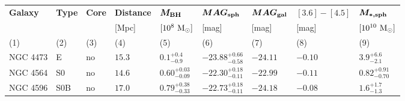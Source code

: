 \begin{table*}                                        
\small                                                
\begin{center}                                        
\begin{tabular}{lllllllll}                           
\hline                                                
\multicolumn{1}{l}{{\bf Galaxy}} &                   
\multicolumn{1}{l}{{\bf Type}} &                     
\multicolumn{1}{l}{{\bf Core}} &                     
\multicolumn{1}{l}{{\bf Distance}} &                 
\multicolumn{1}{l}{{\bf $\bm{M_{\rm BH}}$}} &  
\multicolumn{1}{l}{{\bf $\bm{MAG_{\rm sph}}$}} &  
\multicolumn{1}{l}{{\bf $\bm{MAG_{\rm gal}}$}} &  
\multicolumn{1}{l}{{\bf $\bm{[3.6]-[4.5]}$}} &  
\multicolumn{1}{l}{{\bf $\bm{M_{\rm *,sph}}$}} \\  
\multicolumn{1}{l}{} &                                
\multicolumn{1}{l}{} &                                
\multicolumn{1}{l}{} &                                
\multicolumn{1}{l}{[Mpc]} &                           
\multicolumn{1}{l}{$[10^8~\rm M_{\odot}]$} &         
\multicolumn{1}{l}{[mag]} &                                
\multicolumn{1}{l}{[mag]} &                                
\multicolumn{1}{l}{[mag]} &                                
\multicolumn{1}{l}{$[10^{10}~\rm M_{\odot}]$} \\                             
\multicolumn{1}{l}{(1)} &                             
\multicolumn{1}{l}{(2)} &                             
\multicolumn{1}{l}{(3)} &                             
\multicolumn{1}{l}{(4)} &                             
\multicolumn{1}{l}{(5)} &                             
\multicolumn{1}{l}{(6)} &                             
\multicolumn{1}{l}{(7)} &                             
\multicolumn{1}{l}{(8)} &                             
\multicolumn{1}{l}{(9)} \\                         
\hline                                                
NGC 4473  &  E  &  no   &  $15.3$  &  $0.1_{-0.9}^{+0.4}$   &  $-23.88_{-0.58}^{+0.66}$   &  $-24.11$   &  $-0.10$  &  $3.9_{-2.1}^{+6.6}$   \\ 
NGC 4564  &  S0  &  no   &  $14.6$  &  $0.60_{-0.09}^{+0.03}$   &  $-22.30_{-0.11}^{+0.18}$   &  $-22.99$   &  $-0.11$  &  $0.82_{-0.70}^{+0.91}$   \\ 
NGC 4596  &  S0B  &  no   &  $17.0$  &  $0.79_{-0.33}^{+0.38}$   &  $-22.73_{-0.11}^{+0.18}$   &  $-24.18$   &  $-0.08$  &  $1.6_{-1.3}^{+1.7}$   \\ 

\end{tabular}
\end{center}
\end{table*}
